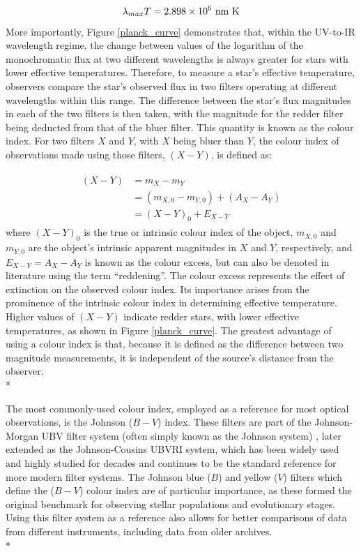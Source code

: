 \documentclass[12pt, a4paper]{report}
\begin{document}
\begin{equation}
\lambda_{max} T = 2.898 \times 10^{6} \textnormal{ nm K}
\label{wien_eq}
\end{equation}
More importantly, Figure \ref{planck_curve} demonstrates that, within the UV-to-IR wavelength regime, the change between values of the logarithm of the monochromatic flux at two different wavelengths is always greater for stars with lower effective temperatures. Therefore, to measure a star's effective temperature, observers compare the star's observed flux in two filters operating at different wavelengths within this range. The difference between the star's flux magnitudes in each of the two filters is then taken, with the magnitude for the redder filter being deducted from that of the bluer filter. This quantity is known as the colour index. For two filters $X$ and $Y$, with $X$ being bluer than $Y$, the colour index of observations made using those filters, $(X-Y)$, is defined as:

\begin{align}
\begin{split}
(X-Y) &= m_{X} - m_{Y} \\
 &= (m_{X,0} - m_{Y,0}) + (A_{X} - A_{Y}) \\
 &= (X-Y)_{0} + E_{X-Y}
\end{split}
\label{colour_index}
\end{align}
where $(X-Y)_{0}$ is the true or intrinsic colour index of the object, $m_{X,0}$ and $m_{Y,0}$ are the object's intrinsic apparent magnitudes in $X$ and $Y$, respectively, and $E_{X-Y} = A_{X} - A_{Y}$ is known as the colour excess, but can also be denoted in literature using the term ``reddening''. The colour excess represents the effect of extinction on the observed colour index. Its importance arises from the prominence of the intrinsic colour index in determining effective temperature. Higher values of $(X-Y)$ indicate redder stars, with lower effective temperatures, as shown in Figure \ref{planck_curve}. The greatest advantage of using a colour index is that, because it is defined as the difference between two magnitude measurements, it is independent of the source's distance from the observer.\\*

The most commonly-used colour index, employed as a reference for most optical observations, is the Johnson ($B-V$) index. These filters are part of the Johnson-Morgan UBV filter system (often simply known as the Johnson system) \citep{1953ApJ...117..313J}, later extended as the Johnson-Cousins UBVRI \citep{1990PASP..102.1181B} system, which has been widely used and highly studied for decades and continues to be the standard reference for more modern filter systems. The Johnson blue ($B$) and yellow ($V$) filters which define the ($B-V$) colour index are of particular importance, as these formed the original benchmark for observing stellar populations and evolutionary stages. Using this filter system as a reference also allows for better comparisons of data from different instruments, including data from older archives.\\*
\end{document}
